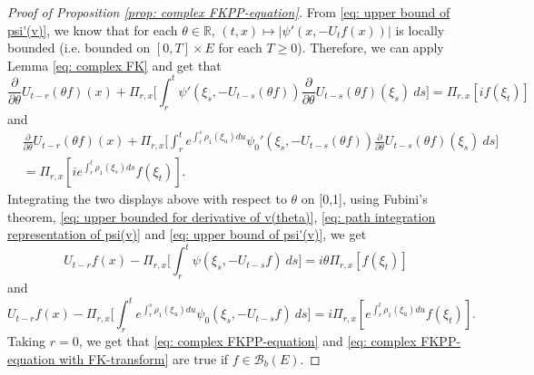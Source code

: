 \documentclass[EJP]{ejpecp} %
\begin{document}
\begin{proof}[Proof of Proposition \ref{prop: complex FKPP-equation}]
	From \eqref{eq: upper bound of psi'(v)}, we know that for each $\theta\in \mathbb R$, $(t,x) \mapsto |\psi'(x,-U_tf(x))|$ is locally bounded (i.e. bounded on $[0,T]\times E$ for each $T \geq 0$).
	Therefore, we can apply Lemma \ref{eq: complex FK} and get that
\[
    \frac{\partial}{\partial \theta} U_{t-r}(\theta f)(x) + \Pi_{r,x} \Big[\int_r^t \psi' (\xi_s,- U_{t-s}(\theta f) )\frac{\partial}{\partial \theta} U_{t-s}(\theta f)(\xi_s)~ds\Big]
    = \Pi_{r,x} [i f(\xi_t)]
\]
  	and
\begin{align}
    & \frac{\partial}{\partial \theta} U_{t-r}(\theta f)(x) + \Pi_{r,x} \Big[\int_r^t e^{\int_r^s \rho_1(\xi_u)du}\psi_0' (\xi_s,- U_{t-s}(\theta f) )\frac{\partial}{\partial \theta} U_{t-s}(\theta f)(\xi_s)~ds\Big]\\
	& = \Pi_{r,x} [i e^{\int_r^t \rho_1(\xi_s)ds}f(\xi_t)].
\end{align}
	Integrating the two displays above with respect to $\theta$  on [0,1], using
	Fubini's theorem, \eqref{eq: upper bounded for derivative of v(theta)}, \eqref{eq: path integration representation of psi(v)} and \eqref{eq: upper bound of psi'(v)}, we get
\[
    U_{t-r}f(x) - \Pi_{r,x} \Big[\int_r^t \psi (\xi_s,-U_{t-s}f ) ~ds\Big]
    = i \theta \Pi_{r,x} [f(\xi_t)]
\]
	and
\[
    U_{t-r}f(x) - \Pi_{r,x} \Big[\int_r^t e^{\int_r^s \rho_1(\xi_u)du} \psi_0 (\xi_s,- U_{t-s}f ) ~ds\Big]
    = i \Pi_{r,x} [e^{\int_r^t\rho_1(\xi_u)du}f(\xi_t)].
\]
  	Taking $r = 0$, we get that \eqref{eq: complex FKPP-equation} and \eqref{eq: complex FKPP-equation with FK-transform} are true if $f\in \mathcal B_b(E)$.


\end{proof}
\end{document}
